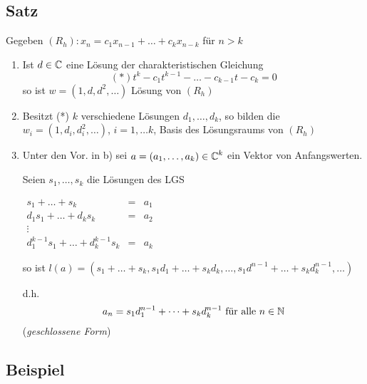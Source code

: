 
\subsection{Satz} %


Gegeben $(R_h) : x_n = c_1x_{n-1} + \dots + c_kx_{n-k}$ für $n > k$

\begin{enumerate}
	\item Ist $d\in\operatorname{\mathbb{C}}$ eine Lösung der charakteristischen Gleichung 
	\[ (*) t^k - c_1t^{k-1} - \dots - c_{k-1}t - c_k = 0 \]
	so ist $w = (1, d, d^2, \dots)$ Lösung von $(R_h)$
	
	\item
	Besitzt (*) $k$ verschiedene Lösungen $d_1, \dots, d_k$, so bilden die $w_i = (1, d_i, d_i^2, \dots)$, $i = 1, \dots k$, Basis des Lösungsraums von $(R_h)$
	
	\item
	Unter den Vor. in b) sei $a = (a_1, \dots, a_k) \in \operatorname{\mathbb{C}}^k$ ein Vektor von Anfangswerten.
	
	Seien $s_1, \dots, s_k$
 die Lösungen des LGS
 
	$\begin{array}{lcl}
	s_1 + \dots + s_k &=& a_1 \\
	d_1s_1 + \dots + d_ks_k &=& a_2 \\
	\vdots \\
	d_1^{k-1}s_1 + \dots + d_k^{k-1}s_k &=& a_k
	\end{array}$
	
	so ist $l(a) = (s_1 + \dots + s_k, s_1d_1 + \dots + s_kd_k, \dots, s_1d^{n-1} + \dots + s_kd_k^{n-1}, \dots)$

	d.h. \[ a_n = s_1d_1^{n-1} + \dots + s_kd_k^{n-1} \text{ für alle } n \in \operatorname{\mathbb{N}} \]
	(\emph{geschlossene Form})
	
	
\end{enumerate}

\subsection{Beispiel} %

